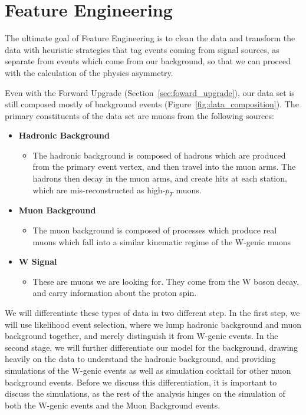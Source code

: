 \chapter{Feature Engineering}
\label{ch:feature_engineering}
The ultimate goal of Feature Engineering is to clean the data and transform the
data with heuristic strategies that tag events coming from signal sources, as
separate from events which come from our background, so that we can proceed with
the calculation of the physics asymmetry.

Even with the Forward Upgrade (Section~\ref{sec:foward_upgrade}), our data set
is still composed mostly of background events
(Figure~\ref{fig:data_composition}). The primary constituents of the data set
are muons from the following sources:

\begin{itemize}
  \item \textbf{Hadronic Background}
    \begin{itemize}
      \item The hadronic background is composed of hadrons which are produced
        from the primary event vertex, and then travel into the muon arms. The
        hadrons then decay in the muon arms, and create hits at each station,
        which are mis-reconstructed as high-$p_T$ muons.
    \end{itemize}
  \item \textbf{Muon Background}
    \begin{itemize}
        \item The muon background is composed of processes which produce real
          muons which fall into a similar kinematic regime of the W-genic muons
    \end{itemize}
  \item \textbf{W Signal}
    \begin{itemize}
        \item These are muons we are looking for. They come from the W boson
          decay, and carry information about the proton spin.
    \end{itemize}
\end{itemize}

We will differentiate these types of data in two different step. In the first
step, we will use likelihood event selection, where we lump hadronic background
and muon background together, and merely distinguish it from W-genic events. In
the second stage, we will further differentiate our model for the background,
drawing heavily on the data to understand the hadronic background, and providing
simulations of the W-genic events as well as simulation cocktail for other muon
background events. Before we discuss this differentiation, it is important to
discuss the simulations, as the rest of the analysis hinges on the simulation of
both the W-genic events and the Muon Background events.

